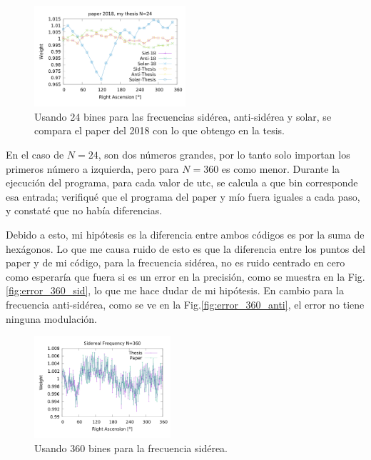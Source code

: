 \begin{figure}[H]
	\centering
	\includegraphics[width=0.5\textwidth]{solar_anti_sid_my_and_paper_in_24.png}
	\caption{Usando 24 bines para las frecuencias sidérea, anti-sidérea y solar, se compara el paper del 2018 con lo que obtengo en la tesis.}
	\label{fig:all_24}
\end{figure}


En el caso de $N=24$, son dos números grandes, por lo tanto solo importan los primeros número a izquierda, pero para  $N=360$ es como menor. Durante la ejecución del programa, para cada valor de utc, se calcula a que bin corresponde esa entrada; verifiqué que el programa del paper y mío fuera iguales a cada paso, y constaté que no había diferencias.

Debido a esto, mi hipótesis es la diferencia entre ambos códigos es por la suma de hexágonos. Lo que me causa ruido de esto es que la diferencia entre los puntos del paper y de mi código, para la frecuencia sidérea,  no es ruido centrado en cero como esperaría que fuera si es un error en la precisión, como se muestra en la Fig.\ref{fig:error_360_sid}, lo que me hace dudar de mi hipótesis. En cambio para la frecuencia anti-sidérea, como se ve en la Fig.\ref{fig:error_360_anti}, el error no tiene ninguna modulación.

\begin{figure}[H]
	\centering
	\includegraphics[width=0.45\textwidth]{sidereal_my_and_paper_in_360.png}
	\caption{Usando 360 bines para la frecuencia sidérea.}
	\label{fig:sid_360}
\end{figure}


